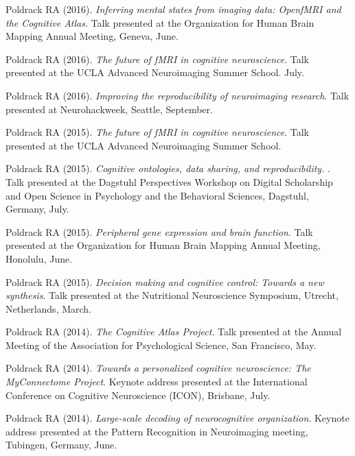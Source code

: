 Poldrack RA (2016). \emph{Inferring mental states from imaging data: OpenfMRI and the Cognitive Atlas}. Talk presented at the Organization for Human Brain Mapping Annual Meeting, Geneva, June. \vspace{2mm} 

Poldrack RA (2016). \emph{The future of fMRI in cognitive neuroscience}. Talk presented at the UCLA Advanced Neuroimaging Summer School. July. \vspace{2mm} 

Poldrack RA (2016). \emph{ Improving the reproducibility of neuroimaging research}. Talk presented at Neurohackweek, Seattle, September. \vspace{2mm} 

Poldrack RA (2015). \emph{The future of fMRI in cognitive neuroscience}. Talk presented at the UCLA Advanced Neuroimaging Summer School. \vspace{2mm} 

Poldrack RA (2015). \emph{Cognitive ontologies, data sharing, and reproducibility. }. Talk presented at the Dagstuhl Perspectives Workshop on Digital Scholarship and Open Science in Psychology and the Behavioral Sciences, Dagstuhl, Germany, July. \vspace{2mm} 

Poldrack RA (2015). \emph{Peripheral gene expression and brain function}. Talk presented at the Organization for Human Brain Mapping Annual Meeting, Honolulu, June. \vspace{2mm} 

Poldrack RA (2015). \emph{Decision making and cognitive control: Towards a new synthesis}. Talk presented at the Nutritional Neuroscience Symposium, Utrecht, Netherlands, March. \vspace{2mm} 

Poldrack RA (2014). \emph{The Cognitive Atlas Project}. Talk presented at the Annual Meeting of the Association for Psychological Science, San Francisco, May. \vspace{2mm} 

Poldrack RA (2014). \emph{Towards a personalized cognitive neuroscience: The MyConnectome Project}. Keynote address presented at the International Conference on Cognitive Neuroscience (ICON), Brisbane, July. \vspace{2mm} 

Poldrack RA (2014). \emph{Large-scale decoding of neurocognitive organization}. Keynote address presented at the Pattern Recognition in Neuroimaging meeting, Tubingen, Germany, June. \vspace{2mm} 

